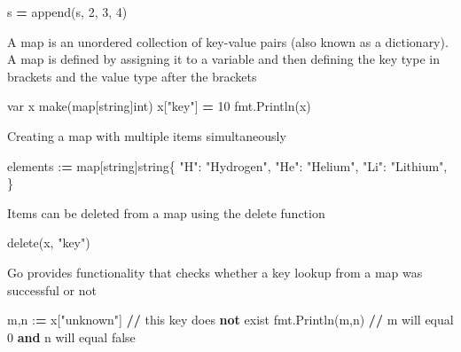 \documentclass[]{book}
\newenvironment{Shaded}{\begin{snugshade}}{\end{snugshade}}
\newcommand{\BuiltInTok}[1]{#1}
\newcommand{\DecValTok}[1]{\textcolor[rgb]{0.00,0.00,0.81}{#1}}
\newcommand{\KeywordTok}[1]{\textcolor[rgb]{0.13,0.29,0.53}{\textbf{#1}}}
\newcommand{\NormalTok}[1]{#1}
\newcommand{\OperatorTok}[1]{\textcolor[rgb]{0.81,0.36,0.00}{\textbf{#1}}}
\newcommand{\StringTok}[1]{\textcolor[rgb]{0.31,0.60,0.02}{#1}}
\begin{document}
\begin{Shaded}
\begin{Highlighting}[]
\NormalTok{s }\OperatorTok{=}\NormalTok{ append(s, }\DecValTok{2}\NormalTok{, }\DecValTok{3}\NormalTok{, }\DecValTok{4}\NormalTok{)}
\end{Highlighting}
\end{Shaded}

A map is an unordered collection of key-value pairs (also known as a dictionary). A map is defined by assigning it to a variable and then defining the key type in brackets and the value type after the brackets

\begin{Shaded}
\begin{Highlighting}[]
\NormalTok{var x make(}\BuiltInTok{map}\NormalTok{[string]}\BuiltInTok{int}\NormalTok{)}
\NormalTok{x[}\StringTok{"key"}\NormalTok{] }\OperatorTok{=} \DecValTok{10} 
\NormalTok{fmt.Println(x)}
\end{Highlighting}
\end{Shaded}

Creating a map with multiple items simultaneously

\begin{Shaded}
\begin{Highlighting}[]
\NormalTok{elements :}\OperatorTok{=} \BuiltInTok{map}\NormalTok{[string]string\{}
  \StringTok{"H"}\NormalTok{:  }\StringTok{"Hydrogen"}\NormalTok{,}
  \StringTok{"He"}\NormalTok{: }\StringTok{"Helium"}\NormalTok{,}
  \StringTok{"Li"}\NormalTok{: }\StringTok{"Lithium"}\NormalTok{,}
\NormalTok{\}}
\end{Highlighting}
\end{Shaded}

Items can be deleted from a map using the delete function

\begin{Shaded}
\begin{Highlighting}[]
\NormalTok{delete(x, }\StringTok{"key"}\NormalTok{)}
\end{Highlighting}
\end{Shaded}

Go provides functionality that checks whether a key lookup from a map was successful or not

\begin{Shaded}
\begin{Highlighting}[]
\NormalTok{m,n :}\OperatorTok{=}\NormalTok{ x[}\StringTok{"unknown"}\NormalTok{] }\OperatorTok{//}\NormalTok{ this key does }\KeywordTok{not}\NormalTok{ exist}
\NormalTok{fmt.Println(m,n) }\OperatorTok{//}\NormalTok{ m will equal }\DecValTok{0} \KeywordTok{and}\NormalTok{ n will equal false}
\end{Highlighting}
\end{Shaded}
\end{document}
